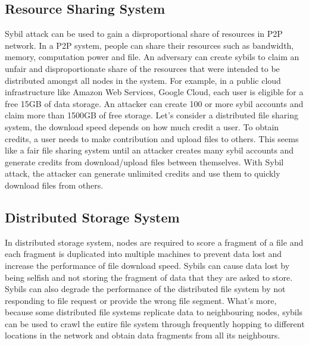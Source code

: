 \documentclass[conference]{IEEEtran}
\begin{document}
\subsection{Resource Sharing System}
Sybil attack can be used to gain a disproportional share of resources in P2P network. 
In a P2P system, people can share their resources such as bandwidth, memory, computation power and file. 
An adversary can create sybils to claim an unfair and disproportionate share of the resources that were intended to be 
distributed amongst all nodes in the system. For example, in a public cloud infrastructure like Amazon Web Services, Google Cloud, 
each user is eligible for a free 15GB of data storage. An attacker can create 100 or more sybil accounts and claim more than 1500GB of free storage.
Let's consider a distributed file sharing system, the download speed depends on how much credit a user. To obtain credits, a user needs to make contribution and upload files to others.
This seems like a fair file sharing system until an attacker creates many sybil accounts and generate credits from download/upload files between themselves.
With Sybil attack, the attacker can generate unlimited credits and use them to quickly download files from others.


\subsection{Distributed Storage System}
In distributed storage system, nodes are required to score a fragment of a file and each fragment is duplicated into multiple machines to prevent data lost 
and increase the performance of file download speed.
Sybils can cause data lost by being selfish and not storing the fragment of data that they are asked to store. 
Sybils can also degrade the performance of the distributed file system by not responding to file request or provide the wrong file segment. 
What's more, because some distributed file systems replicate data to neighbouring nodes, sybils can be used to crawl the entire file system through frequently 
hopping to different locations in the network and obtain data fragments from all its neighbours.\cite{Lian07anempirical}\cite{wolchok09defeatingvanish}
\end{document}
